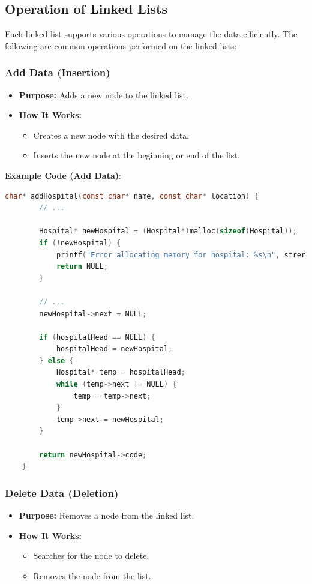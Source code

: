 \documentclass[12pt,a4paper]{report}
\begin{document}
\subsection{Operation of Linked Lists}
Each linked list supports various operations to manage the data efficiently. The following are common operations performed on the linked lists:

\subsubsection{Add Data (Insertion)}
\begin{itemize}
    \item \normalsize \textbf{Purpose:} Adds a new node to the linked list.
    \item \normalsize \textbf{How It Works:}
    \begin{itemize}
        \item Creates a new node with the desired data.
        \item Inserts the new node at the beginning or end of the list.
    \end{itemize}
\end{itemize}

\normalsize \textbf{Example Code (Add Data)}:
\begin{lstlisting}[language=C, caption=Add Hospital]
    char* addHospital(const char* name, const char* location) {
        // ...

        Hospital* newHospital = (Hospital*)malloc(sizeof(Hospital));
        if (!newHospital) {
            printf("Error allocating memory for hospital: %s\n", strerror(errno));
            return NULL;
        }

        // ...
        newHospital->next = NULL;

        if (hospitalHead == NULL) {
            hospitalHead = newHospital;
        } else {
            Hospital* temp = hospitalHead;
            while (temp->next != NULL) {
                temp = temp->next;
            }
            temp->next = newHospital;
        }

        return newHospital->code;
    }
\end{lstlisting}

\subsubsection{Delete Data (Deletion)}
\begin{itemize}
    \item \normalsize \textbf{Purpose:} Removes a node from the linked list.
    \item \normalsize \textbf{How It Works:}
    \begin{itemize}
        \item Searches for the node to delete.
        \item Removes the node from the list.
    \end{itemize}
\end{itemize}
\end{document}
